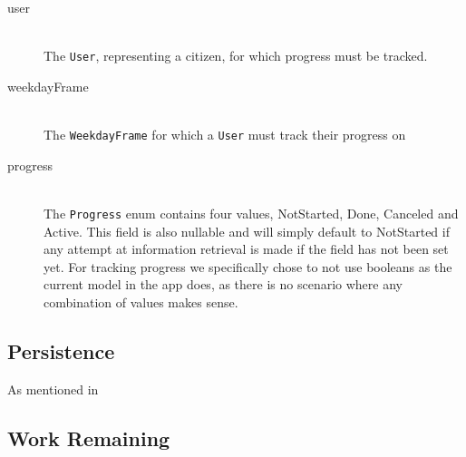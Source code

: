 \noindent
\begin{description}
    \item [user] \hfill \\
    The \texttt{User}, representing a citizen, for which progress must be tracked.
    \item [weekdayFrame] \hfill \\
    The \texttt{WeekdayFrame} for which a \texttt{User} must track their progress on
    \item [progress] \hfill \\
    The \texttt{Progress} enum contains four values, NotStarted, Done, Canceled and Active.
    This field is also nullable and will simply default to NotStarted if any attempt at information retrieval is made if the field has not been set yet.
    For tracking progress we specifically chose to not use booleans as the current model in the app does, as there is no scenario where any combination of values makes sense.
\end{description}


\subsection{Persistence}
As mentioned in 


\subsection{Work Remaining} %

